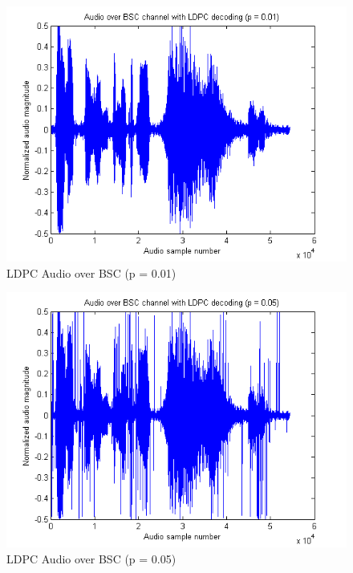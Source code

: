 \documentclass[a4paper]{article}
\begin{document}
\begin{figure}[hbtp]
\centering
\includegraphics[scale=0.5]{plots/audio_over_bsc_ldpc_p_001.png}
\caption{LDPC Audio over BSC (p = 0.01)}
\end{figure}

\begin{figure}[hbtp]
\centering
\includegraphics[scale=0.5]{plots/audio_over_bsc_ldpc_p_005.png}
\caption{LDPC Audio over BSC (p = 0.05)}
\end{figure}
\end{document}

